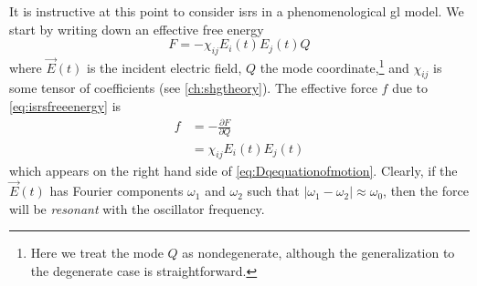 It is instructive at this point to consider \gls{isrs} in a phenomenological \gls{gl} model.
We start by writing down an effective free energy\citep{stevens_coherent_2002}
\begin{equation}\label{eq:isrsfreeenergy}
F = -\chi_{ij}E_i(t)E_j(t)Q
\end{equation}
where $\vec{E}(t)$ is the incident electric field, $Q$ the mode coordinate,\footnote{Here we treat the mode $Q$ as nondegenerate, although the generalization to the degenerate case is straightforward.} and $\chi_{ij}$ is some tensor of coefficients (see \cref{ch:shgtheory}).
The effective force $f$ due to \cref{eq:isrsfreeenergy} is
\begin{align}
f &= -\frac{\partial F}{\partial Q}\\
&= \chi_{ij}E_i(t)E_j(t)
\end{align}
which appears on the right hand side of \cref{eq:Dqequationofmotion}.
Clearly, if the $\vec{E}(t)$ has Fourier components $\omega_1$ and $\omega_2$ such that $|\omega_1-\omega_2|\approx\omega_0$, then the force will be \emph{resonant} with the oscillator frequency.


